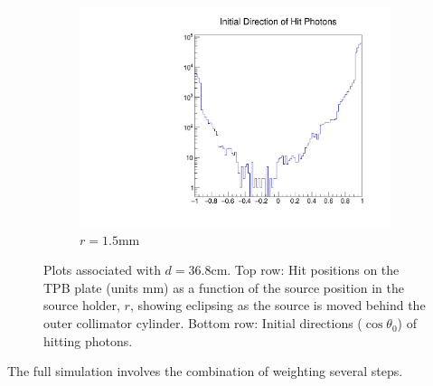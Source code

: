 \documentclass[aps,pra,notitlepage,groupedaddress]{revtex4-1}
\begin{document}
\begin{figure}
\begin{center}
\begin{subfigure}{0.32\textwidth}
\begin{minipage}{1.0\textwidth}
			\includegraphics[width=1.0\textwidth]{figures/init_150.pdf}
		\end{minipage}
		\caption{$r=1.5$mm}
	\end{subfigure}
	\end{center}
	\caption{Plots associated with $d=36.8$cm. Top row: Hit positions on the TPB plate (units mm) as a function of the source position in the source holder, $r$, showing eclipsing as the source is moved behind the outer collimator cylinder. Bottom row: Initial directions ($\cos \theta_0$) of hitting photons. \label{fig:hitpos}} 
\end{figure}

The full simulation involves the combination of weighting several steps.
\end{document}
